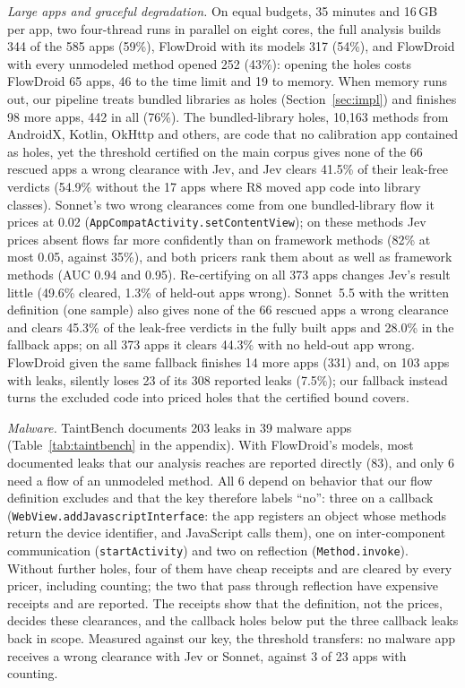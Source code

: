 \emph{Large apps and graceful degradation.}
On equal budgets, 35 minutes and 16\,GB per app, two four-thread runs in parallel on eight cores, the full analysis builds 344 of the 585 apps (59\%), FlowDroid with its models 317 (54\%), and FlowDroid with every unmodeled method opened 252 (43\%): opening the holes costs FlowDroid 65 apps, 46 to the time limit and 19 to memory.
When memory runs out, our pipeline treats bundled libraries as holes (Section~\ref{sec:impl}) and finishes 98 more apps, 442 in all (76\%).
The bundled-library holes, 10{,}163 methods from AndroidX, Kotlin, OkHttp and others, are code that no calibration app contained as holes, yet the threshold certified on the main corpus gives none of the 66 rescued apps a wrong clearance with Jev, and Jev clears 41.5\% of their leak-free verdicts (54.9\% without the 17 apps where R8 moved app code into library classes).
Sonnet's two wrong clearances come from one bundled-library flow it prices at 0.02 (\texttt{AppCompatActivity.setContentView}); on these methods Jev prices absent flows far more confidently than on framework methods (82\% at most 0.05, against 35\%), and both pricers rank them about as well as framework methods (AUC 0.94 and 0.95).
Re-certifying on all 373 apps changes Jev's result little (49.6\% cleared, 1.3\% of held-out apps wrong).
Sonnet~5.5 with the written definition (one sample) also gives none of the 66 rescued apps a wrong clearance and clears 45.3\% of the leak-free verdicts in the fully built apps and 28.0\% in the fallback apps; on all 373 apps it clears 44.3\% with no held-out app wrong.
FlowDroid given the same fallback finishes 14 more apps (331) and, on 103 apps with leaks, silently loses 23 of its 308 reported leaks (7.5\%); our fallback instead turns the excluded code into priced holes that the certified bound covers.

\emph{Malware.}
TaintBench documents 203 leaks in 39 malware apps (Table~\ref{tab:taintbench} in the appendix).
With FlowDroid's models, most documented leaks that our analysis reaches are reported directly (83), and only 6 need a flow of an unmodeled method.
All 6 depend on behavior that our flow definition excludes and that the key therefore labels ``no'': three on a callback (\texttt{WebView.}\allowbreak\texttt{addJavascriptInterface}: the app registers an object whose methods return the device identifier, and JavaScript calls them), one on inter-component communication (\texttt{startActivity}) and two on reflection (\texttt{Method.invoke}).
Without further holes, four of them have cheap receipts and are cleared by every pricer, including counting; the two that pass through reflection have expensive receipts and are reported.
The receipts show that the definition, not the prices, decides these clearances, and the callback holes below put the three callback leaks back in scope.
Measured against our key, the threshold transfers: no malware app receives a wrong clearance with Jev or Sonnet, against 3 of 23 apps with counting.

